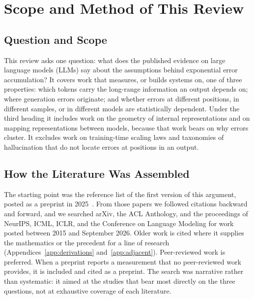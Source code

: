 \documentclass{ieeeaccess}
\begin{document}
\section{Scope and Method of This Review}
\label{sec:scope}

\subsection{Question and Scope}
This review asks one question: what does the published evidence on large language models (LLMs) say about the assumptions behind exponential error accumulation? It covers work that measures, or builds systems on, one of three properties: which tokens carry the long-range information an output depends on; where generation errors originate; and whether errors at different positions, in different samples, or in different models are statistically dependent. Under the third heading it includes work on the geometry of internal representations and on mapping representations between models, because that work bears on why errors cluster. It excludes work on training-time scaling laws and taxonomies of hallucination that do not locate errors at positions in an output.

\subsection{How the Literature Was Assembled}
The starting point was the reference list of the first version of this argument, posted as a preprint in 2025~\cite{arbuzov2025beyond}. From those papers we followed citations backward and forward, and we searched arXiv, the ACL Anthology, and the proceedings of NeurIPS, ICML, ICLR, and the Conference on Language Modeling for work posted between 2015 and September 2026. Older work is cited where it supplies the mathematics or the precedent for a line of research (Appendices~\ref{app:derivations} and~\ref{app:adjacent}). Peer-reviewed work is preferred. When a preprint reports a measurement that no peer-reviewed work provides, it is included and cited as a preprint. The search was narrative rather than systematic: it aimed at the studies that bear most directly on the three questions, not at exhaustive coverage of each literature.
\end{document}
